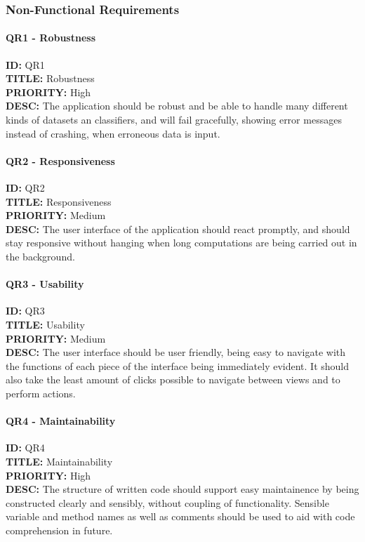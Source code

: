 \subsubsection{Non-Functional Requirements}
\paragraph*{QR1 - Robustness}
\textbf{ID:} QR1 \\
\textbf{TITLE:} Robustness \\
\textbf{PRIORITY:} High \\
\textbf{DESC:} The application should be robust and be able to handle many different kinds of datasets an classifiers, and will fail gracefully, showing error messages instead of crashing, when erroneous data is input.  \\
\paragraph*{QR2 - Responsiveness} 
\textbf{ID:} QR2 \\
\textbf{TITLE:} Responsiveness \\
\textbf{PRIORITY:} Medium \\
\textbf{DESC:} The user interface of the application should react promptly, and should stay responsive without hanging when long computations are being carried out in the background.  \\
\paragraph*{QR3 - Usability}
\textbf{ID:} QR3 \\
\textbf{TITLE:} Usability \\
\textbf{PRIORITY:} Medium \\
\textbf{DESC:} The user interface should be user friendly, being easy to navigate with the functions of each piece of the interface being immediately evident. It should also take the least amount of clicks possible to navigate between views and to perform actions. \\
\paragraph*{QR4 - Maintainability}
\textbf{ID:} QR4 \\
\textbf{TITLE:} Maintainability \\
\textbf{PRIORITY:} High \\
\textbf{DESC:} The structure of written code should support easy maintainence by being constructed clearly and sensibly, without coupling of functionality. Sensible variable and method names as well as comments should be used to aid with code comprehension in future.\\
